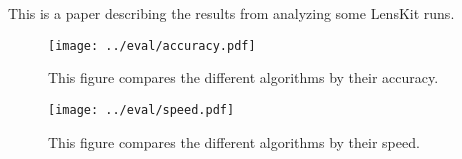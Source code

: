 \documentclass{article}
\begin{document}
   
This is a paper describing the results from analyzing some LensKit runs. 

\begin{figure}
\begin{center}
\texttt{[image: ../eval/accuracy.pdf]}
\caption{This figure compares the different algorithms by their accuracy.}
\end{center}
\end{figure}

\begin{figure}
\begin{center}
\texttt{[image: ../eval/speed.pdf]}
\caption{This figure compares the different algorithms by their speed.}
\end{center}
\end{figure}
\end{document}
